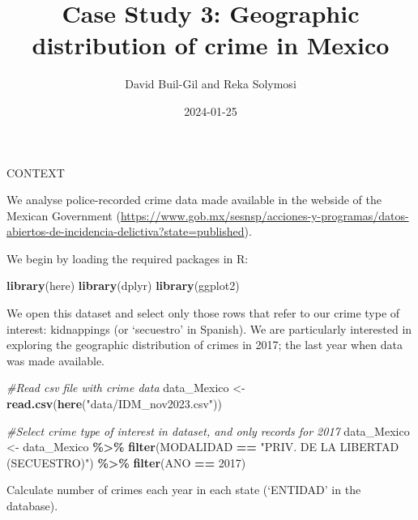 \documentclass[
]{article}
\title{Case Study 3: Geographic distribution of crime in Mexico}
\author{David Buil-Gil and Reka Solymosi}
\date{2024-01-25}
\newenvironment{Shaded}{\begin{snugshade}}{\end{snugshade}}
\newcommand{\CommentTok}[1]{\textcolor[rgb]{0.56,0.35,0.01}{\textit{#1}}}
\newcommand{\DecValTok}[1]{\textcolor[rgb]{0.00,0.00,0.81}{#1}}
\newcommand{\FunctionTok}[1]{\textcolor[rgb]{0.13,0.29,0.53}{\textbf{#1}}}
\newcommand{\NormalTok}[1]{#1}
\newcommand{\OtherTok}[1]{\textcolor[rgb]{0.56,0.35,0.01}{#1}}
\newcommand{\SpecialCharTok}[1]{\textcolor[rgb]{0.81,0.36,0.00}{\textbf{#1}}}
\newcommand{\StringTok}[1]{\textcolor[rgb]{0.31,0.60,0.02}{#1}}
\begin{document}
\maketitle

CONTEXT

We analyse police-recorded crime data made available in the webside of
the Mexican Government
(\url{https://www.gob.mx/sesnsp/acciones-y-programas/datos-abiertos-de-incidencia-delictiva?state=published}).

We begin by loading the required packages in R:

\begin{Shaded}
\begin{Highlighting}[]
\FunctionTok{library}\NormalTok{(here)}
\FunctionTok{library}\NormalTok{(dplyr)}
\FunctionTok{library}\NormalTok{(ggplot2)}
\end{Highlighting}
\end{Shaded}

We open this dataset and select only those rows that refer to our crime
type of interest: kidnappings (or `secuestro' in Spanish). We are
particularly interested in exploring the geographic distribution of
crimes in 2017; the last year when data was made available.

\begin{Shaded}
\begin{Highlighting}[]
\CommentTok{\#Read csv file with crime data}
\NormalTok{data\_Mexico }\OtherTok{\textless{}{-}} \FunctionTok{read.csv}\NormalTok{(}\FunctionTok{here}\NormalTok{(}\StringTok{"data/IDM\_nov2023.csv"}\NormalTok{))}

\CommentTok{\#Select crime type of interest in dataset, and only records for 2017}
\NormalTok{data\_Mexico }\OtherTok{\textless{}{-}}\NormalTok{ data\_Mexico }\SpecialCharTok{\%\textgreater{}\%}
  \FunctionTok{filter}\NormalTok{(MODALIDAD }\SpecialCharTok{==} \StringTok{"PRIV. DE LA LIBERTAD (SECUESTRO)"}\NormalTok{) }\SpecialCharTok{\%\textgreater{}\%}
  \FunctionTok{filter}\NormalTok{(ANO }\SpecialCharTok{==} \DecValTok{2017}\NormalTok{)}
\end{Highlighting}
\end{Shaded}

Calculate number of crimes each year in each state (`ENTIDAD' in the
database).
\end{document}
